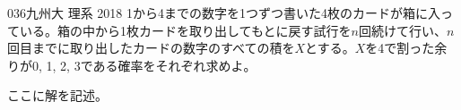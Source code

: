 \begin{prob}{036}{}{九州大 理系 2018}
 1から4までの数字を1つずつ書いた4枚のカードが箱に入っている。箱の中から1枚カードを取り出してもとに戻す試行を$n$回続けて行い、$n$回目までに取り出したカードの数字のすべての積を$X$とする。$X$を4で割った余りが0, 1, 2, 3である確率をそれぞれ求めよ。
\end{prob}
ここに解を記述。